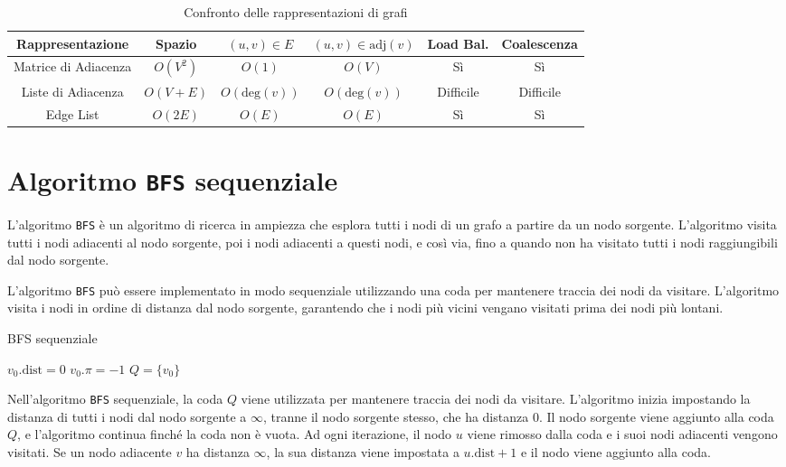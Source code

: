 \begin{table}[H]
  \centering
  \caption{Confronto delle rappresentazioni di grafi}
  \begin{tabular}{|c|c|c|c|c|c|}
    \hline
    Rappresentazione & Spazio & $(u,v)\in E$ & $(u,v) \in \text{adj}(v)$ &
    Load Bal. & Coalescenza \\
    \hline
    Matrice di Adiacenza & $O(V^2)$ & $O(1)$ & $O(V)$ & Sì & Sì \\
    Liste di Adiacenza & $O(V + E)$ & $O(\text{deg}(v))$ & $O(\text{deg}(v))$ & Difficile & Difficile \\
    Edge List & $O(2E)$ & $O(E)$ & $O(E)$ & Sì & Sì \\
    \hline
  \end{tabular}
\end{table}
\section{Algoritmo \texttt{BFS} sequenziale}

L'algoritmo \texttt{BFS} è un algoritmo di ricerca in ampiezza che esplora
tutti i nodi di un grafo a partire da un nodo sorgente. L'algoritmo visita
tutti i nodi adiacenti al nodo sorgente, poi i nodi adiacenti a questi nodi,
e così via, fino a quando non ha visitato tutti i nodi raggiungibili dal nodo
sorgente.

L'algoritmo \texttt{BFS} può essere implementato in modo sequenziale
utilizzando una coda per mantenere traccia dei nodi da visitare. L'algoritmo
visita i nodi in ordine di distanza dal nodo sorgente, garantendo che i
nodi più vicini vengano visitati prima dei nodi più lontani.

\begin{algorithm}[H]
\caption{BFS sequenziale}
\DontPrintSemicolon
\SetAlgoLined
{}
\( v_0.\text{dist} = 0 \)\;
\( v_0.\pi = -1 \)\;
\( Q = \{v_0\} \)\;
\end{algorithm}

Nell'algoritmo \texttt{BFS} sequenziale, la coda \(Q\) viene utilizzata
per mantenere traccia dei nodi da visitare. L'algoritmo inizia impostando
la distanza di tutti i nodi dal nodo sorgente a \(\infty\), tranne il
nodo sorgente stesso, che ha distanza \(0\). Il nodo sorgente viene aggiunto
alla coda \(Q\), e l'algoritmo continua finché la coda non è vuota. Ad ogni
iterazione, il nodo \(u\) viene rimosso dalla coda e i suoi nodi adiacenti
vengono visitati. Se un nodo adiacente \(v\) ha distanza \(\infty\), la sua
distanza viene impostata a \(u.\text{dist} + 1\) e il nodo viene aggiunto
alla coda.



